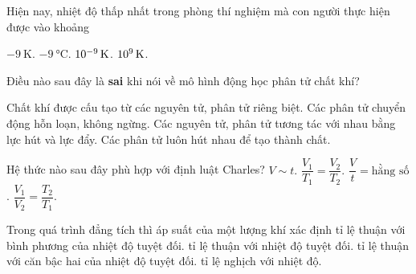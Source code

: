 \begin{ex}
	Hiện nay, nhiệt độ thấp nhất trong phòng thí nghiệm mà con người thực hiện được vào khoảng
	
	\choice
	{$\SI{-9}{\kelvin}$.}
	{$\SI{-9}{\celsius}$.}
	{\True $\SI{E-9}{\kelvin}$.}
	{$\SI{E9}{\kelvin}$.}
	\loigiai{}
\end{ex}
\begin{ex}
Điều nào sau đây là \textbf{sai} khi nói về mô hình động học phân tử chất khí?
	
	\choice
	{Chất khí được cấu tạo từ các nguyên tử, phân tử riêng biệt.}
	{Các phân tử chuyển động hỗn loạn, không ngừng.}
	{Các nguyên tử, phân tử tương tác với nhau bằng lực hút và lực đẩy.}
	{\True Các phân tử luôn hút nhau để tạo thành chất.}
	\loigiai{}
\end{ex}
\begin{ex}
	Hệ thức nào sau đây phù hợp với định luật Charles?
	\choice
	{$V\sim t$.}
	{\True $\dfrac{V_1}{T_1}=\dfrac{V_2}{T_2}$.}
	{$\dfrac{V}{t}=\text{hằng số}$.}
	{$\dfrac{V_1}{V_2}=\dfrac{T_2}{T_1}$.}
	\loigiai{}
\end{ex}
\begin{ex}
	Trong quá trình đẳng tích thì áp suất của một lượng khí xác định
	\choice
	{tỉ lệ thuận với bình phương của nhiệt độ tuyệt đối.}
	{\True tỉ lệ thuận với nhiệt độ tuyệt đối.}
	{tỉ lệ thuận với căn bậc hai của nhiệt độ tuyệt đối.}
	{tỉ lệ nghịch với nhiệt độ.}
	\loigiai{}
\end{ex}
